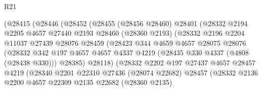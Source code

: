 \begin{lexlean}{R21}
\begin{coremodule}
                        (@28415
                          (@28446
                            (@28452
                              (@28455
                                (@28456 @28460)
                                @28401
                                (@28332
                                  @2194
                                  @2205
                                  @4657
                                  @27440
                                  @2193
                                  @28460
                                  (@28360 @2193)
                                  (@28332
                                    @2196
                                    @2204
                                    @11037
                                    @27439
                                    @28076
                                    @28459
                                    (@28423
                                      @344
                                      @4659
                                      @4657
                                      @28075
                                      @28076
                                      (@28332
                                        @342
                                        @197
                                        @4657
                                        @4657
                                        @4337
                                        @4219
                                        (@28435 @330 @4337 (@4808 (@28438 @330)))
                                        @28385)
                                      @28118)
                                    (@28332
                                      @2202
                                      @197
                                      @27437
                                      @4657
                                      @28457
                                      @4219
                                      (@28340
                                        @2201
                                        @22310
                                        @27436
                                        (@28074 @22682)
                                        @28457
                                        (@28332
                                          @2136
                                          @2200
                                          @4657
                                          @22309
                                          @2135
                                          @22682
                                          (@28360 @2135)

\end{coremodule}
\end{lexlean}
